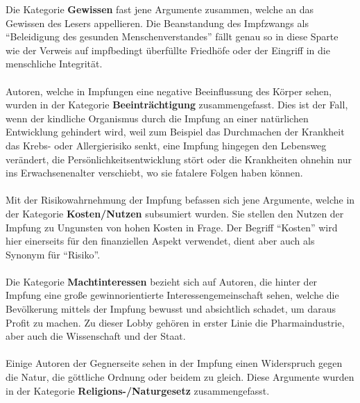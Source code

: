 \documentclass[
    a4paper,
    12pt,
    hyphens,
    chapterprefix=true,
    headheight=33pt,
    footheight=29pt,
    headings=optiontohead,
]{scrartcl}
\begin{document}
\newpage
Die Kategorie \textbf{Gewissen} fast jene Argumente zusammen, welche an das Gewissen des Lesers appellieren. Die Beanstandung des Impfzwangs als "`Beleidigung des gesunden Menschenverstandes"' fällt genau so in diese Sparte wie der Verweis auf impfbedingt überfüllte Friedhöfe oder der Eingriff in die menschliche Integrität.\\
\\
Autoren, welche in Impfungen eine negative Beeinflussung des Körper sehen, wurden in der Kategorie \textbf{Beeinträchtigung} zusammengefasst. Dies ist der Fall, wenn der kindliche Organismus durch die Impfung an einer natürlichen Entwicklung gehindert wird, weil zum Beispiel das Durchmachen der Krankheit das Krebs- oder Allergierisiko senkt, eine Impfung hingegen den Lebensweg verändert, die Persönlichkeitsentwicklung stört oder die Krankheiten ohnehin nur ins Erwachsenenalter verschiebt, wo sie fatalere Folgen haben können.\\
\\
Mit der Risikowahrnehmung der Impfung befassen sich jene Argumente, welche in der Kategorie \textbf{Kosten/Nutzen} subsumiert wurden. Sie stellen den Nutzen der Impfung zu Ungunsten von hohen Kosten in Frage. Der Begriff "`Kosten"' wird hier einerseits für den finanziellen Aspekt verwendet, dient aber auch als Synonym für "`Risiko"'.\\
\\
Die Kategorie \textbf{Machtinteressen} bezieht sich auf Autoren, die hinter der Impfung eine große gewinnorientierte Interessengemeinschaft sehen, welche die Bevölkerung mittels der Impfung bewusst und absichtlich schadet, um daraus Profit zu machen. Zu dieser Lobby gehören in erster Linie die Pharmaindustrie, aber auch die Wissenschaft und der Staat.\\
\\
Einige Autoren der Gegnerseite sehen in der Impfung einen Widerspruch gegen die Natur, die göttliche Ordnung oder beidem zu gleich. Diese Argumente wurden in der Kategorie \textbf{Religions-/Naturgesetz} zusammengefasst.\\
\end{document}
